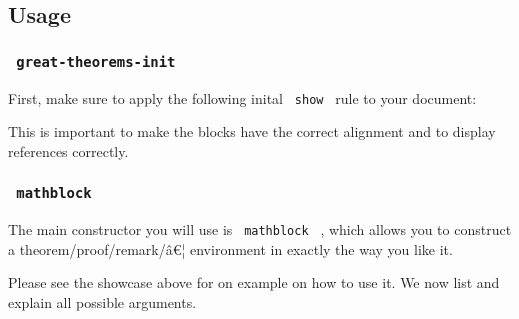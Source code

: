 \subsection{Usage}\label{usage}

\subsubsection{\texorpdfstring{\texttt{\ great-theorems-init\ }}{ great-theorems-init }}\label{great-theorems-init}

First, make sure to apply the following inital \texttt{\ show\ } rule to
your document:

\begin{Shaded}
\begin{Highlighting}[]
\end{Highlighting}
\end{Shaded}

This is important to make the blocks have the correct alignment and to
display references correctly.

\subsubsection{\texorpdfstring{\texttt{\ mathblock\ }}{ mathblock }}\label{mathblock}

The main constructor you will use is \texttt{\ mathblock\ } , which
allows you to construct a theorem/proof/remark/â€¦ environment in
exactly the way you like it.

Please see the showcase above for on example on how to use it. We now
list and explain all possible arguments.

